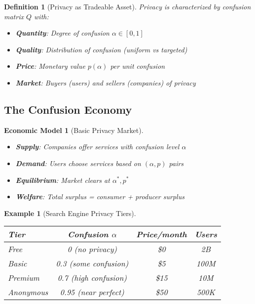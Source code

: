 \documentclass[11pt,final]{article}
\newtheorem{definition}[theorem]{Definition}
\newtheorem{example}[theorem]{Example}
\newtheorem{model}[theorem]{Economic Model}
\begin{document}
\begin{definition}[Privacy as Tradeable Asset]
Privacy is characterized by confusion matrix $Q$ with:
\begin{itemize}
    \item \textbf{Quantity}: Degree of confusion $\alpha \in [0,1]$
    \item \textbf{Quality}: Distribution of confusion (uniform vs targeted)
    \item \textbf{Price}: Monetary value $p(\alpha)$ per unit confusion
    \item \textbf{Market}: Buyers (users) and sellers (companies) of privacy
\end{itemize}
\end{definition}

\subsection{The Confusion Economy}

\begin{model}[Basic Privacy Market]
\begin{itemize}
    \item \textbf{Supply}: Companies offer services with confusion level $\alpha$
    \item \textbf{Demand}: Users choose services based on $(\alpha, p)$ pairs
    \item \textbf{Equilibrium}: Market clears at $\alpha^*, p^*$
    \item \textbf{Welfare}: Total surplus = consumer + producer surplus
\end{itemize}
\end{model}

\begin{example}[Search Engine Privacy Tiers]
\begin{center}
\begin{tabular}{lccc}
\toprule
\textbf{Tier} & \textbf{Confusion $\alpha$} & \textbf{Price/month} & \textbf{Users} \\
\midrule
Free & 0 (no privacy) & \$0 & 2B \\
Basic & 0.3 (some confusion) & \$5 & 100M \\
Premium & 0.7 (high confusion) & \$15 & 10M \\
Anonymous & 0.95 (near perfect) & \$50 & 500K \\
\bottomrule
\end{tabular}
\end{center}
\end{example}
\end{document}
